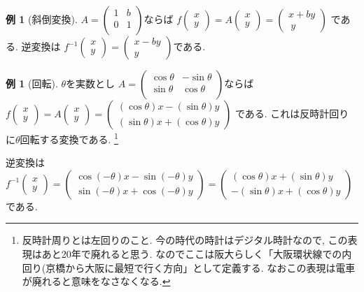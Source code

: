 \documentclass[dvipdfmx,a4paper,11pt]{article} %
\theoremstyle{definition}
\newtheorem{exa}[thm]{例}
\begin{document}
 \begin{exa}[斜倒変換]
$
A=\begin{pmatrix}
1& b \\
0& 1\\
\end{pmatrix}
$ならば
$
f\begin{pmatrix}
x \\ y
 \end{pmatrix} 
 =
 A
\begin{pmatrix}
x \\ y
 \end{pmatrix}  = 
 \begin{pmatrix}
x + by \\\ y
 \end{pmatrix}
$
である.
逆変換は
$
f^{-1}\begin{pmatrix}
x \\ y
 \end{pmatrix} 
 =
\begin{pmatrix}
 x -by \\ y
 \end{pmatrix}
$である. 
\end{exa}

 \begin{exa}[回転]
   $\theta$を実数とし
$
A=\begin{pmatrix}
\cos \theta & -\sin \theta\\
\sin \theta& \cos \theta  \\
\end{pmatrix}
$ならば
$
f\begin{pmatrix}
x \\ y
 \end{pmatrix} 
 =
 A
\begin{pmatrix}
x \\ y
 \end{pmatrix}  = 
 \begin{pmatrix}
(\cos \theta ) x - (\sin \theta )y \\
(\sin \theta ) x + (\cos \theta )y 
 \end{pmatrix}
$
である. これは反時計回りに$\theta$回転する変換である. \footnote{反時計周りとは左回りのこと. 今の時代の時計はデジタル時計なので, この表現はあと20年で廃れると思う. なのでここは阪大らしく「大阪環状線での内回り(京橋から大阪に最短で行く方向」として定義する. なおこの表現は電車が廃れると意味をなさなくなる. }


逆変換は
$
f^{-1}\begin{pmatrix}
x \\ y
 \end{pmatrix} 
 =
\begin{pmatrix}
\cos (-\theta ) x - \sin (-\theta )y \\
\sin (-\theta ) x + \cos (-\theta )y 
 \end{pmatrix}  
 =
 \begin{pmatrix}
(\cos \theta ) x + (\sin \theta ) y \\
-(\sin \theta ) x + (\cos \theta ) y 
 \end{pmatrix}  
$である.
\end{exa}
\end{document}
